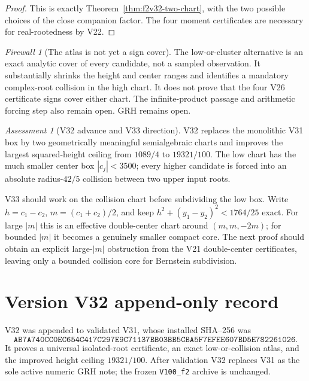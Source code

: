 \documentclass[11pt]{article}
\theoremstyle{definition}
\theoremstyle{remark}
\newtheorem{assessment}[theorem]{Assessment}
\newtheorem{firewall}[theorem]{Firewall}
\begin{document}
\begin{proof}
This is exactly Theorem~\ref{thm:f2v32-two-chart}, with the two possible
choices of the close companion factor.  The four moment certificates are
necessary for real-rootedness by V22.
\end{proof}

\begin{firewall}[The atlas is not yet a sign cover]
\label{fire:f2v32}
The low-or-cluster alternative is an exact analytic cover of every
candidate, not a sampled observation.  It substantially shrinks the height
and center ranges and identifies a mandatory complex-root collision in the
high chart.  It does not prove that the four V26 certificate signs cover
either chart.  The infinite-product passage and arithmetic forcing step
also remain open.  GRH remains open.
\end{firewall}

\begin{assessment}[V32 advance and V33 direction]
\label{ass:f2v32}
V32 replaces the monolithic V31 box by two geometrically meaningful
semialgebraic charts and improves the largest squared-height ceiling from
\(1089/4\) to \(19321/100\).  The low chart has the much smaller center
box \(|c_j|<3500\); every higher candidate is forced into an absolute
radius-\(42/5\) collision between two upper input roots.

V33 should work on the collision chart before subdividing the low box.
Write \(h=c_1-c_2\), \(m=(c_1+c_2)/2\), and keep
\(h^2+(y_1-y_2)^2<1764/25\) exact.  For large \(|m|\) this is an
effective double-center chart around \((m,m,-2m)\); for bounded \(|m|\)
it becomes a genuinely smaller compact core.  The next proof should obtain
an explicit large-\(|m|\) obstruction from the V21 double-center
certificates, leaving only a bounded collision core for Bernstein
subdivision.
\end{assessment}

\section*{Version V32 append-only record}

V32 was appended to validated V31, whose installed SHA--256 was
\[
 \texttt{AB7A740CC0EC654C417C297E9C71137BB03BB5CBA5F7EFEE607BD5E782261026}.
 \tag{N32.22}
\]
It proves a universal isolated-root certificate, an exact low-or-collision
atlas, and the improved height ceiling \(19321/100\).  After validation V32
replaces V31 as the sole active numeric GRH note; the frozen
\texttt{V100\_f2} archive is unchanged.
\end{document}
